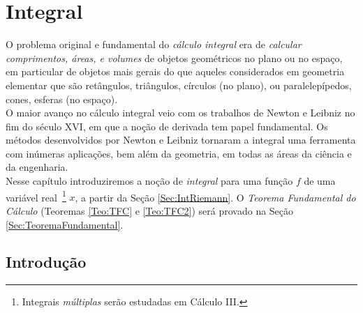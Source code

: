 

\chapter{Integral}\label{CAP:Integral}

\ifdefined\updateans
\fi

O problema original e fundamental do \emph{cálculo integral} era
de \emph{calcular comprimentos, áreas, e volumes} de objetos geométricos no
plano ou no espaço, em particular de objetos 
mais gerais do que aqueles
considerados em geometria elementar que são retângulos,
triângulos, círculos (no plano), ou paralelepípedos, cones,
esferas (no espaço).\\

O maior avanço no cálculo integral 
veio com os trabalhos de Newton e Leibniz
no fim do século XVI, em que a noção de derivada tem papel fundamental.
Os métodos desenvolvidos por Newton e Leibniz
tornaram a integral uma ferramenta com inúmeras aplicações, bem além da 
geometria, em todas as áreas da ciência e da engenharia.
\\

Nesse capítulo introduziremos a noção de \emph{integral} para uma função $f$ de
uma variável real~\footnote{Integrais \emph{múltiplas} serão estudadas em
Cálculo III.} $x$, a partir da Seção \ref{Sec:IntRiemann}.
O \emph{Teorema Fundamental do Cálculo} 
(Teoremas \ref{Teo:TFC} e \ref{Teo:TFC2}) será provado na Seção
\ref{Sec:TeoremaFundamental}.

\section{Introdução}

